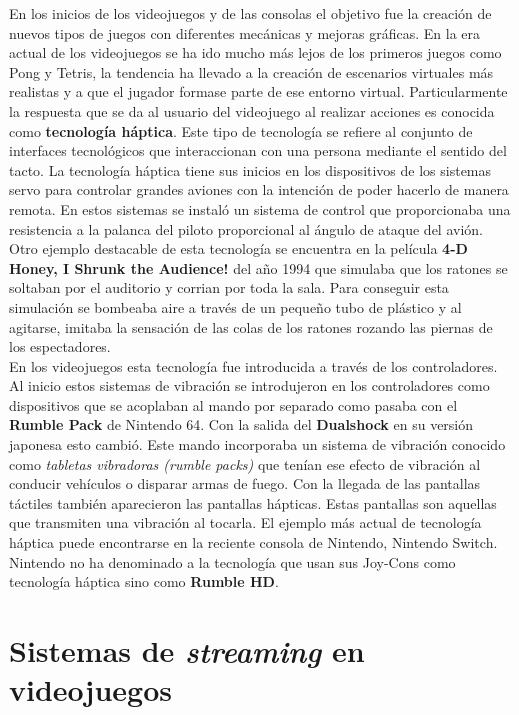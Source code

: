 En los inicios de los videojuegos y de las consolas el objetivo fue la creaci\'on de nuevos tipos de juegos con diferentes mec\'anicas y mejoras gr\'aficas. En la era actual de los videojuegos se ha ido mucho m\'as lejos de los primeros juegos como Pong y Tetris, la tendencia ha llevado a la creaci\'on de escenarios virtuales m\'as realistas y a que el jugador formase parte de ese entorno virtual. Particularmente la respuesta que se da al usuario del videojuego al realizar acciones es conocida como \textbf{tecnolog\'ia h\'aptica}. Este tipo de tecnolog\'ia se refiere al conjunto de interfaces tecnol\'ogicos que interaccionan con una persona mediante el sentido del tacto. La tecnolog\'ia h\'aptica tiene sus inicios en los dispositivos de los sistemas servo para controlar grandes aviones con la intenci\'on de poder hacerlo de manera remota. En estos sistemas se instal\'o un sistema de control que proporcionaba una resistencia a la palanca del piloto proporcional al \'angulo de ataque del avi\'on. Otro ejemplo destacable de esta tecnolog\'ia se encuentra en la pel\'icula \textbf{4-D Honey, I Shrunk the Audience!} del a\~no 1994 que simulaba que los ratones se soltaban por el auditorio y corrian por toda la sala. Para conseguir esta simulaci\'on se bombeaba aire a trav\'es de un peque\~no tubo de pl\'astico y al agitarse, imitaba la sensaci\'on de las colas de los ratones rozando las piernas de los espectadores. \\

En los videojuegos esta tecnolog\'ia fue introducida a trav\'es de los controladores. Al inicio estos sistemas de vibraci\'on se introdujeron en los controladores como dispositivos que se acoplaban al mando por separado como pasaba con el \textbf{Rumble Pack} de Nintendo 64. Con la salida del \textbf{Dualshock} en su versi\'on japonesa esto cambi\'o. Este mando incorporaba un sistema de vibraci\'on conocido como \textit{tabletas vibradoras (rumble packs)} que ten\'ian ese efecto de vibraci\'on al conducir veh\'iculos o disparar armas de fuego. Con la llegada de las pantallas t\'actiles tambi\'en aparecieron las pantallas h\'apticas. Estas pantallas son aquellas que transmiten una vibraci\'on al tocarla. El ejemplo m\'as actual de tecnolog\'ia h\'aptica puede encontrarse en la reciente consola de Nintendo, Nintendo Switch. Nintendo no ha denominado a la tecnolog\'ia que usan sus Joy-Cons como tecnolog\'ia h\'aptica sino como \textbf{Rumble HD}. 


\section{Sistemas de \textit{streaming} en videojuegos}

